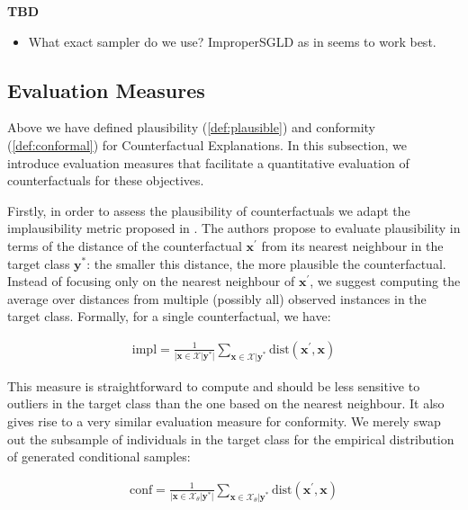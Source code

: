 \documentclass{article}
\begin{document}
\textbf{TBD}

\begin{itemize}
  \item What exact sampler do we use? ImproperSGLD as in \citet{grathwohl2020your} seems to work best.
\end{itemize}

\subsection{Evaluation Measures}\label{evaluation}

Above we have defined plausibility (\ref{def:plausible}) and conformity (\ref{def:conformal}) for Counterfactual Explanations. In this subsection, we introduce evaluation measures that facilitate a quantitative evaluation of counterfactuals for these objectives. 

Firstly, in order to assess the plausibility of counterfactuals we adapt the implausibility metric proposed in \citet{guidotti2022counterfactual}. The authors propose to evaluate plausibility in terms of the distance of the counterfactual $\mathbf{x}^{\prime}$ from its nearest neighbour in the target class $\mathbf{y}^*$: the smaller this distance, the more plausible the counterfactual. Instead of focusing only on the nearest neighbour of $\mathbf{x}^{\prime}$, we suggest computing the average over distances from multiple (possibly all) observed instances in the target class. Formally, for a single counterfactual, we have:

\begin{equation}\label{eq:impl}
  \begin{aligned}
    \text{impl} = \frac{1}{\lvert\mathbf{x} \in \mathcal{X}|\mathbf{y}^*\rvert} \sum_{\mathbf{x} \in \mathcal{X}|\mathbf{y}^*} \text{dist}(\mathbf{x}^{\prime},\mathbf{x})
  \end{aligned}
\end{equation}

This measure is straightforward to compute and should be less sensitive to outliers in the target class than the one based on the nearest neighbour. It also gives rise to a very similar evaluation measure for conformity. We merely swap out the subsample of individuals in the target class for the empirical distribution of generated conditional samples:

\begin{equation}\label{eq:conf}
  \begin{aligned}
    \text{conf} = \frac{1}{\lvert\mathbf{x} \in \mathcal{X}_{\theta}|\mathbf{y}^*\rvert} \sum_{\mathbf{x} \in \mathcal{X}_{\theta}|\mathbf{y}^*} \text{dist}(\mathbf{x}^{\prime},\mathbf{x})
  \end{aligned}
\end{equation}
\end{document}
